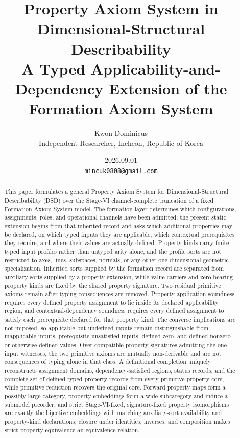 \documentclass[11pt]{article}
\title{Property Axiom System in Dimensional-Structural Describability\\[0.35em]
\large A Typed Applicability-and-Dependency Extension of the Formation Axiom System}
\author{Kwon Dominicus\\\small Independent Researcher, Incheon, Republic of Korea}
\date{2026.09.01\\[0.4em]\small\href{mailto:mincuk0808@gmail.com}{\texttt{mincuk0808@gmail.com}}}
\theoremstyle{definition}
\theoremstyle{remark}
\begin{document}
\maketitle

\begin{abstract}
This paper formulates a general Property Axiom System for Dimensional-Structural Describability (DSD) over the Stage-VI channel-complete truncation of a fixed Formation Axiom System model.
The formation layer determines which configurations, assignments, roles, and operational channels have been admitted; the present static extension begins from that inherited record and asks which additional properties may be declared, on which typed inputs they are applicable, which contextual prerequisites they require, and where their values are actually defined.
Property kinds carry finite typed input profiles rather than untyped arity alone, and the profile sorts are not restricted to axes, lines, subspaces, normals, or any other one-dimensional geometric specialization.
Inherited sorts supplied by the formation record are separated from auxiliary sorts supplied by a property extension, while value carriers and zero-bearing property kinds are fixed by the shared property signature.
Two residual primitive axioms remain after typing consequences are removed.
Property-application soundness requires every defined property assignment to lie inside its declared applicability region, and contextual-dependency soundness requires every defined assignment to satisfy each prerequisite declared for that property kind.
The converse implications are not imposed, so applicable but undefined inputs remain distinguishable from inapplicable inputs, prerequisite-unsatisfied inputs, defined zero, and defined nonzero or otherwise defined values.
Over compatible property signatures admitting the one-input witnesses, the two primitive axioms are mutually non-derivable and are not consequences of typing alone in that class.
A definitional completion uniquely reconstructs assignment domains, dependency-satisfied regions, status records, and the complete set of defined typed property records from every primitive property core, while primitive reduction recovers the original core.
Forward property maps form a possibly large category, property embeddings form a wide subcategory and induce a submodel preorder, and strict Stage-VI-fixed, signature-fixed property isomorphisms are exactly the bijective embeddings with matching auxiliary-sort availability and property-kind declarations; closure under identities, inverses, and composition makes strict property equivalence an equivalence relation.

\end{abstract}
\end{document}
